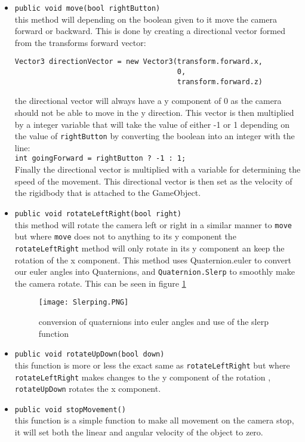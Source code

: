 \begin{itemize}
\item {\tt public void move(bool rightButton)}\\
this method will depending on the boolean given to it move the camera forward or backward. This is done by creating a directional vector formed from the transforms forward vector:
\begin{verbatim}
Vector3 directionVector = new Vector3(transform.forward.x, 
                                      0,
                                      transform.forward.z)
\end{verbatim}
the directional vector will always have a y component of 0 as the camera should not be able to move in the y direction. This vector is then multiplied by a integer variable that will take the value of either -1 or 1 depending on the value of {\tt rightButton} by converting the boolean into an integer with the line:\\
{\tt int goingForward = rightButton ? -1 : 1;}\\
Finally the directional vector is multiplied with a variable for determining the speed of the movement. This directional vector is then set as the velocity of the rigidbody that is attached to the GameObject. 

\item {\tt public void rotateLeftRight(bool right)}\\
this method will rotate the camera left or right in a similar manner to {\tt move} but where {\tt move} does not to anything to its y component the {\tt rotateLeftRight} method will only rotate in its y component an keep the rotation of the x component. This method uses {Quaternion.euler } to convert our euler angles into Quaternions, and {\tt Quaternion.Slerp} to smoothly make the camera rotate. This can be seen in figure \ref{Slerping} 
\begin{figure}[H]
\centering
\texttt{[image: Slerping.PNG]}
\caption{conversion of quaternions into euler angles and use of the slerp function}
\label{Slerping}
\end{figure}
\item {\tt public void rotateUpDown(bool down)}\\
this function is more or less the exact same as {\tt rotateLeftRight} but where {\tt rotateLeftRight} makes changes to the y component of the rotation , {\tt rotateUpDown} rotates the x component. 

\item {\tt public void stopMovement()}\\
this function is a simple function to make all movement on the camera stop, it will set both the linear and angular velocity of the object to zero.
\end{itemize}


